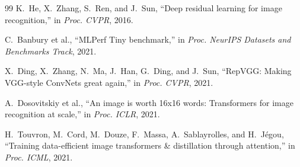 \documentclass[12pt,a4paper]{article}
\begin{document}
\begin{thebibliography}{99}
K.~He, X.~Zhang, S.~Ren, and J.~Sun, ``Deep residual learning for image recognition,'' in
\emph{Proc. CVPR}, 2016.

C.~Banbury et al., ``MLPerf Tiny benchmark,'' in \emph{Proc. NeurIPS Datasets and
Benchmarks Track}, 2021.

X.~Ding, X.~Zhang, N.~Ma, J.~Han, G.~Ding, and J.~Sun, ``RepVGG: Making VGG-style ConvNets
great again,'' in \emph{Proc. CVPR}, 2021.

A.~Dosovitskiy et al., ``An image is worth 16x16 words: Transformers for image recognition
at scale,'' in \emph{Proc. ICLR}, 2021.

H.~Touvron, M.~Cord, M.~Douze, F.~Massa, A.~Sablayrolles, and H.~J\'egou, ``Training
data-efficient image transformers \& distillation through attention,'' in \emph{Proc.
ICML}, 2021.

\end{thebibliography}
\end{document}
